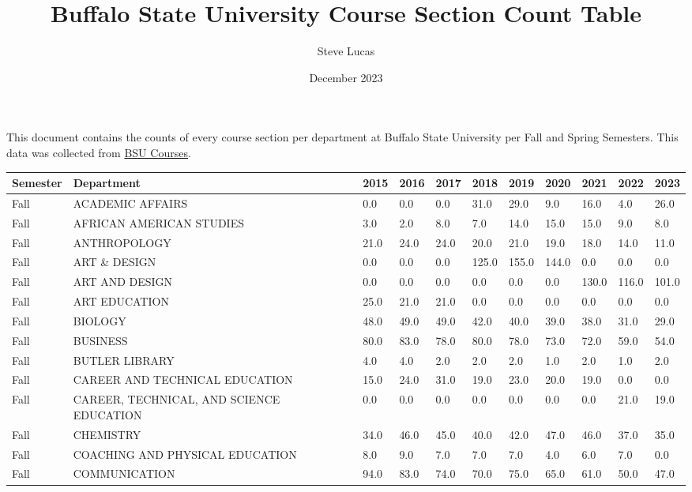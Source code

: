 \documentclass{article}
\title{Buffalo State University Course Section Count Table}
\author{Steve Lucas}
\date{December 2023}
\begin{document}
\maketitle


This document contains the counts of every course section per department at Buffalo State University per Fall and Spring Semesters. This data was collected from \href{https://registrar.buffalostate.edu/courses}{BSU Courses}.


\begin{longtable}[]{|l|p{4cm}|p{0.8cm}|p{0.8cm}|p{0.8cm}|p{0.8cm}|p{0.8cm}|p{0.8cm}|p{0.8cm}|p{0.8cm}|p{0.8cm}|}
\toprule\noalign{}
Semester & Department & 2015 & 2016 & 2017 & 2018 & 2019 & 2020 & 2021 &
2022 & 2023 \\
\midrule\noalign{}
\endhead
\bottomrule\noalign{}
\endlastfoot
Fall & ACADEMIC AFFAIRS & 0.0 & 0.0 & 0.0 & 31.0 & 29.0 & 9.0 & 16.0 &
4.0 & 26.0 \\
Fall & AFRICAN AMERICAN STUDIES & 3.0 & 2.0 & 8.0 & 7.0 & 14.0 & 15.0 &
15.0 & 9.0 & 8.0 \\
Fall & ANTHROPOLOGY & 21.0 & 24.0 & 24.0 & 20.0 & 21.0 & 19.0 & 18.0 &
14.0 & 11.0 \\
Fall & ART \& DESIGN & 0.0 & 0.0 & 0.0 & 125.0 & 155.0 & 144.0 & 0.0 &
0.0 & 0.0 \\
Fall & ART AND DESIGN & 0.0 & 0.0 & 0.0 & 0.0 & 0.0 & 0.0 & 130.0 &
116.0 & 101.0 \\
Fall & ART EDUCATION & 25.0 & 21.0 & 21.0 & 0.0 & 0.0 & 0.0 & 0.0 & 0.0
& 0.0 \\
Fall & BIOLOGY & 48.0 & 49.0 & 49.0 & 42.0 & 40.0 & 39.0 & 38.0 & 31.0 &
29.0 \\
Fall & BUSINESS & 80.0 & 83.0 & 78.0 & 80.0 & 78.0 & 73.0 & 72.0 & 59.0
& 54.0 \\
Fall & BUTLER LIBRARY & 4.0 & 4.0 & 2.0 & 2.0 & 2.0 & 1.0 & 2.0 & 1.0 &
2.0 \\
Fall & CAREER AND TECHNICAL EDUCATION & 15.0 & 24.0 & 31.0 & 19.0 & 23.0
& 20.0 & 19.0 & 0.0 & 0.0 \\
Fall & CAREER, TECHNICAL, AND SCIENCE EDUCATION & 0.0 & 0.0 & 0.0 & 0.0
& 0.0 & 0.0 & 0.0 & 21.0 & 19.0 \\
Fall & CHEMISTRY & 34.0 & 46.0 & 45.0 & 40.0 & 42.0 & 47.0 & 46.0 & 37.0
& 35.0 \\
Fall & COACHING AND PHYSICAL EDUCATION & 8.0 & 9.0 & 7.0 & 7.0 & 7.0 &
4.0 & 6.0 & 7.0 & 0.0 \\
Fall & COMMUNICATION & 94.0 & 83.0 & 74.0 & 70.0 & 75.0 & 65.0 & 61.0 &
50.0 & 47.0 \\

\end{longtable}
\end{document}
